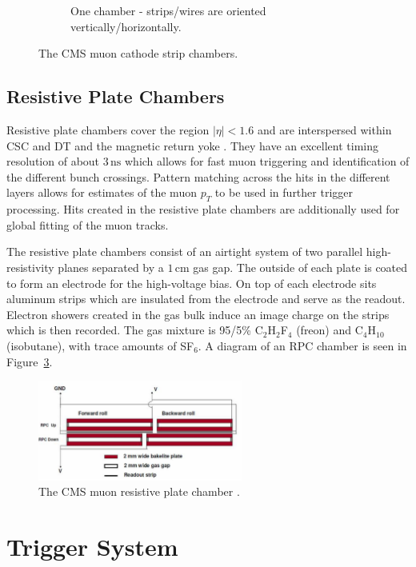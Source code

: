 \begin{figure}
\begin{subfigure}[c]{0.3\textwidth}
\caption{One chamber - strips/wires are oriented vertically/horizontally.}
\label{fig:cscchamber}
\end{subfigure}
\caption{The CMS muon cathode strip chambers.}
\end{figure}

\subsection{Resistive Plate Chambers}

Resistive plate chambers cover the region $|\eta| < 1.6$ and are interspersed within CSC and DT and the magnetic return yoke \cite{rpc}. They have an excellent timing resolution of about $3\,\textrm{ns}$ which allows for fast muon triggering and identification of the different bunch crossings. Pattern matching across the hits in the different layers allows for estimates of the muon $p_{T}$ to be used in further trigger processing. Hits created in the resistive plate chambers are additionally used for global fitting of the muon tracks.

The resistive plate chambers consist of an airtight system of two parallel high-resistivity planes separated by a $1\,\textrm{cm}$ gas gap. The outside of each plate is coated to form an electrode for the high-voltage bias. On top of each electrode sits aluminum strips which are insulated from the electrode and serve as the readout. Electron showers created in the gas bulk induce an image charge on the strips which is then recorded. The gas mixture is 95/5\% C$_{2}$H$_{2}$F$_{4}$ (freon) and C$_{4}$H$_{10}$ (isobutane), with trace amounts of SF$_{6}$. A diagram of an RPC chamber is seen in Figure~\ref{fig:rpc}.

\begin{figure}
\centering
\includegraphics[width=0.6\textwidth]{figs/rpc.png}
\caption[The CMS muon resistive plate chamber.]{The CMS muon resistive plate chamber \cite{rpc}.}
\label{fig:rpc}
\end{figure}

\section{Trigger System}

